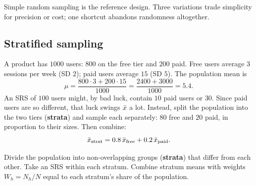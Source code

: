 Simple random sampling is the reference design. Three variations trade simplicity for
precision or cost; one shortcut abandons randomness altogether.

\subsection{Stratified sampling}

A product has $1000$ users: $800$ on the free tier and $200$ paid. Free users average
$3$ sessions per week (SD $2$); paid users average $15$ (SD $5$). The population mean is
\[
  \mu = \frac{800\cdot 3 + 200 \cdot 15}{1000} = \frac{2400+3000}{1000} = 5.4 .
\]
An SRS of $100$ users might, by bad luck, contain $10$ paid users or $30$. Since paid
users are so different, that luck swings $\bar{x}$ a lot. Instead, split the population
into the two tiers (\textbf{strata}) and sample each separately: $80$ free and $20$ paid,
in proportion to their sizes. Then combine:
\[
  \bar{x}_{\text{strat}} = 0.8\,\bar{x}_{\text{free}} + 0.2\,\bar{x}_{\text{paid}} .
\]

\begin{definition}
Divide the population into non-overlapping groups (\textbf{strata}) that differ from each
other. Take an SRS within each stratum. Combine stratum means with weights
$W_h = N_h/N$ equal to each stratum's share of the population.
\end{definition}

